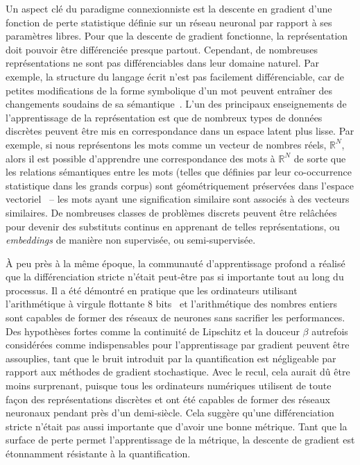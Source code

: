 Un aspect clé du paradigme connexionniste est la descente en gradient d'une fonction de perte statistique définie sur un réseau neuronal par rapport à ses paramètres libres. Pour que la descente de gradient fonctionne, la représentation doit pouvoir être différenciée presque partout. Cependant, de nombreuses représentations ne sont pas différenciables dans leur domaine naturel. Par exemple, la structure du langage écrit n'est pas facilement différenciable, car de petites modifications de la forme symbolique d'un mot peuvent entraîner des changements soudains de sa sémantique~\citep{vanmerrienboer2018phd}. L'un des principaux enseignements de l'apprentissage de la représentation est que de nombreux types de données discrètes peuvent être mis en correspondance dans un espace latent plus lisse. Par exemple, si nous représentons les mots comme un vecteur de nombres réels, $\mathbb R^N$, alors il est possible d'apprendre une correspondance des mots à $\mathbb R^N$ de sorte que les relations sémantiques entre les mots (telles que définies par leur co-occurrence statistique dans les grands corpus) sont géométriquement préservées dans l'espace vectoriel~\citep{pennington2014glove} -- les mots ayant une signification similaire sont associés à des vecteurs similaires. De nombreuses classes de problèmes discrets peuvent être relâchées pour devenir des substituts continus en apprenant de telles représentations, ou \textit{embeddings} de manière non supervisée, ou semi-supervisée.

À peu près à la même époque, la communauté d'apprentissage profond a réalisé que la différenciation stricte n'était peut-être pas si importante tout au long du processus. Il a été démontré en pratique que les ordinateurs utilisant l'arithmétique à virgule flottante 8 bits~\citep{wang2018training} et l'arithmétique des nombres entiers~\citep{wu2018training, jacob2018quantization} sont capables de former des réseaux de neurones sans sacrifier les performances. Des hypothèses fortes comme la continuité de Lipschitz et la douceur $\beta$ autrefois considérées comme indispensables pour l'apprentissage par gradient peuvent être assouplies, tant que le bruit introduit par la quantification est négligeable par rapport aux méthodes de gradient stochastique. Avec le recul, cela aurait dû être moins surprenant, puisque tous les ordinateurs numériques utilisent de toute façon des représentations discrètes et ont été capables de former des réseaux neuronaux pendant près d'un demi-siècle. Cela suggère qu'une différenciation stricte n'était pas aussi importante que d'avoir une bonne métrique. Tant que la surface de perte permet l'apprentissage de la métrique, la descente de gradient est étonnamment résistante à la quantification.

